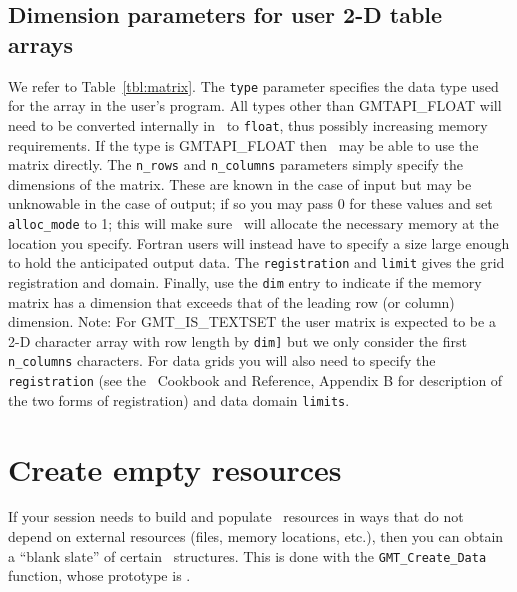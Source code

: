 \documentclass{report}
\begin{document}
\subsection{Dimension parameters for user 2-D table arrays}

We refer to Table~\ref{tbl:matrix}.  The \texttt{type} parameter specifies the
data type used for the array in the user's program.  All types other than GMTAPI\_FLOAT will need
to be converted internally in \GMT\ to \texttt{float}, thus possibly increasing memory requirements.
If the type is GMTAPI\_FLOAT then \GMT\ may be able to use the matrix directly.  The \texttt{n\_rows}
and \texttt{n\_columns} parameters simply specify the dimensions of the matrix.  These are known in
the case of input but may be unknowable in the case
of output; if so you may pass 0 for these values and set \texttt{alloc\_mode} to 1; this will make
sure \GMT\ will allocate the necessary memory at the location you specify.  Fortran users
will instead have to specify a size large enough to hold the anticipated output data.
The \texttt{registration} and \texttt{limit} gives the grid registration and domain.
Finally, use the \texttt{dim} entry to indicate if the memory matrix has a dimension that
exceeds that of the leading row (or column) dimension. Note: For GMT\_IS\_TEXTSET
the user matrix is expected to be a 2-D character array with row length by \texttt{dim]}
but we only consider the first \texttt{n\_columns} characters.  For data grids you will
also need to specify the \texttt{registration}  (see the \GMT\ Cookbook and Reference,
Appendix B for description of the two forms of registration) and data domain \texttt{limits}.

\section{Create empty resources}
\label{sec:create}

If your session needs to build and populate \GMT\ resources in ways that do
not depend on external resources (files, memory locations, etc.), then you
can obtain a ``blank slate'' of certain \GMT\ structures.  
This is done with the \texttt{GMT\_Create\_Data} function, whose prototype is
.
\end{document}
